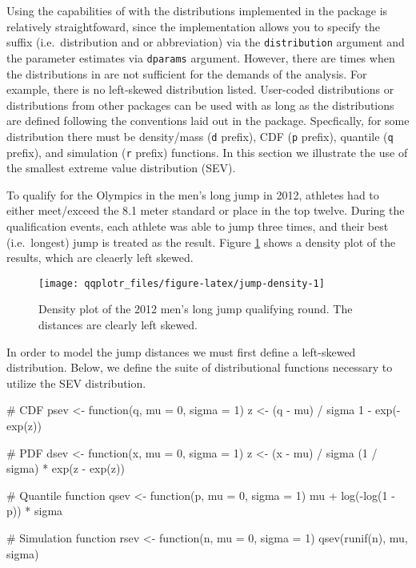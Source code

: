 Using the capabilities of  with the distributions
implemented in the  package is relatively straightfoward,
since the implementation allows you to specify the suffix
(i.e.~distribution and or abbreviation) via the \texttt{distribution}
argument and the parameter estimates via \texttt{dparams} argument.
However, there are times when the distributions in  are not
sufficient for the demands of the analysis. For example, there is no
left-skewed distribution listed. User-coded distributions or
distributions from other packages can be used with  as long
as the distributions are defined following the conventions laid out in
the  package. Specfically, for some distribution there must
be density/mass (\texttt{d} prefix), CDF (\texttt{p} prefix), quantile
(\texttt{q} prefix), and simulation (\texttt{r} prefix) functions. In
this section we illustrate the use of the smallest extreme value
distribution (SEV).

To qualify for the Olympics in the men's long jump in 2012, athletes had
to either meet/exceed the 8.1 meter standard or place in the top twelve.
During the qualification events, each athlete was able to jump three
times, and their best (i.e.~longest) jump is treated as the result.
Figure \ref{fig:jump-density} shows a density plot of the results, which
are cleaerly left skewed.

\begin{Schunk}
\begin{figure}

{\centering \texttt{[image: qqplotr\_files/figure-latex/jump-density-1]} 

}

\caption[Density plot of the 2012 men's long jump qualifying round]{Density plot of the 2012 men's long jump qualifying round. The distances are clearly left skewed.}\label{fig:jump-density}
\end{figure}
\end{Schunk}

In order to model the jump distances we must first define a left-skewed
distribution. Below, we define the suite of distributional functions
necessary to utilize the SEV distribution.

\begin{Schunk}
\begin{Sinput}
# CDF
psev <- function(q, mu = 0, sigma = 1) {
    z <- (q - mu) / sigma
    1 - exp(-exp(z))
}

# PDF
dsev <- function(x, mu = 0, sigma = 1) {
  z <- (x - mu) / sigma
  (1 / sigma) * exp(z - exp(z))
}

# Quantile function
qsev <- function(p, mu = 0, sigma = 1) {
  mu + log(-log(1 - p)) * sigma
}

# Simulation function
rsev <- function(n, mu = 0, sigma = 1) {
  qsev(runif(n), mu, sigma)
}
\end{Sinput}
\end{Schunk}

